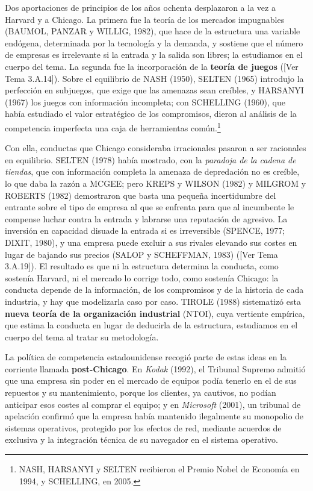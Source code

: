 \documentclass[10pt,a4paper]{article}
\newcommand{\authorfont}[1]{{\fontfamily{EBGaramond-TLF}\selectfont #1}}
\begin{document}
Dos aportaciones de principios de los años ochenta desplazaron a la vez a Harvard y a Chicago. La primera fue la teoría de los mercados impugnables (BAUMOL, PANZAR y WILLIG, 1982), que hace de la estructura una variable endógena, determinada por la tecnología y la demanda, y sostiene que el número de empresas es irrelevante si la entrada y la salida son libres; la estudiamos en el cuerpo del tema. La segunda fue la incorporación de la \textbf{teoría de juegos} ([\authorfont{Ver Tema 3.A.14}]). Sobre el equilibrio de NASH (1950), SELTEN (1965) introdujo la perfección en subjuegos, que exige que las amenazas sean creíbles, y HARSANYI (1967) los juegos con información incompleta; con SCHELLING (1960), que había estudiado el valor estratégico de los compromisos, dieron al análisis de la competencia imperfecta una caja de herramientas común.\footnote{%
    NASH, HARSANYI y SELTEN recibieron el Premio Nobel de Economía en 1994, y SCHELLING, en 2005.
}

Con ella, conductas que Chicago consideraba irracionales pasaron a ser racionales en equilibrio. SELTEN (1978) había mostrado, con la \textit{paradoja de la cadena de tiendas}, que con información completa la amenaza de depredación no es creíble, lo que daba la razón a MCGEE; pero KREPS y WILSON (1982) y MILGROM y ROBERTS (1982) demostraron que basta una pequeña incertidumbre del entrante sobre el tipo de empresa al que se enfrenta para que al incumbente le compense luchar contra la entrada y labrarse una reputación de agresivo. La inversión en capacidad disuade la entrada si es irreversible (SPENCE, 1977; DIXIT, 1980), y una empresa puede excluir a sus rivales elevando sus costes en lugar de bajando sus precios (SALOP y SCHEFFMAN, 1983) ([\authorfont{Ver Tema 3.A.19}]). El resultado es que ni la estructura determina la conducta, como sostenía Harvard, ni el mercado lo corrige todo, como sostenía Chicago: la conducta depende de la información, de los compromisos y de la historia de cada industria, y hay que modelizarla caso por caso. TIROLE (1988) sistematizó esta \textbf{nueva teoría de la organización industrial} (NTOI), cuya vertiente empírica, que estima la conducta en lugar de deducirla de la estructura, estudiamos en el cuerpo del tema al tratar su metodología.

La política de competencia estadounidense recogió parte de estas ideas en la corriente llamada \textbf{post-Chicago}. En \textit{Kodak} (1992), el Tribunal Supremo admitió que una empresa sin poder en el mercado de equipos podía tenerlo en el de sus repuestos y su mantenimiento, porque los clientes, ya cautivos, no podían anticipar esos costes al comprar el equipo; y en \textit{Microsoft} (2001), un tribunal de apelación confirmó que la empresa había mantenido ilegalmente su monopolio de sistemas operativos, protegido por los efectos de red, mediante acuerdos de exclusiva y la integración técnica de su navegador en el sistema operativo.
\end{document}
